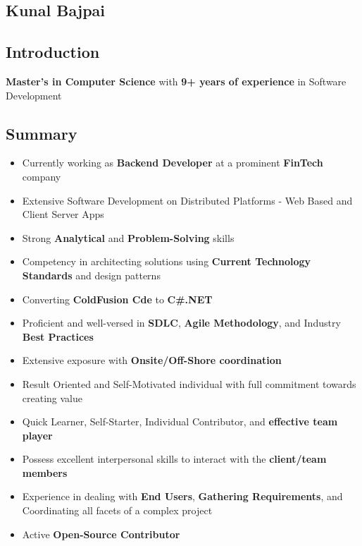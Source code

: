 \documentclass[letterpaper,10pt]{article}
\begin{document}
    \begin{center}
    \section{Kunal Bajpai}
    \end{center}

    \subsection{Introduction}
    \textbf{Master's in Computer Science} with \textbf{9+ years of experience} in Software Development

    \subsection{Summary}
    \begin{itemize}
        \item Currently working as \textbf{Backend Developer} at a prominent \textbf{FinTech} company
        \item Extensive Software Development on Distributed Platforms - Web Based and Client Server Apps
        \item Strong \textbf{Analytical} and \textbf{Problem-Solving} skills
        \item Competency in architecting solutions using \textbf{Current Technology Standards} and design patterns
        \item Converting \textbf{ColdFusion Cde} to \textbf{C\#.NET}
        \item Proficient and well-versed in \textbf{SDLC}, \textbf{Agile Methodology}, and Industry \textbf{Best Practices}
        \item Extensive exposure with \textbf{Onsite/Off-Shore coordination}
        \item Result Oriented and Self-Motivated individual with full commitment towards creating value
        \item Quick Learner, Self-Starter, Individual Contributor, and \textbf{effective team player}
        \item Possess excellent interpersonal skills to interact with the \textbf{client/team members}
        \item Experience in dealing with \textbf{End Users}, \textbf{Gathering Requirements}, and Coordinating all facets of a complex project
        \item Active \textbf{Open-Source Contributor}
    \end{itemize}
\end{document}

